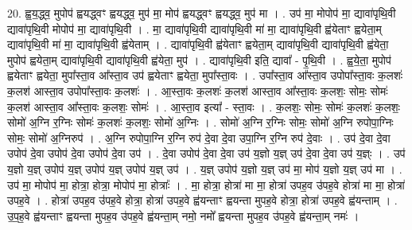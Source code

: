 \documentclass[17pt]{extarticle}
\begin{document}
20. ह्व॒य॒द्ध्व॒ मुपोप॑ ह्वयद्ध्वꣳ ह्वयद्ध्व॒ मुप॑ मा॒ मोप॑ ह्वयद्ध्वꣳ ह्वयद्ध्व॒ मुप॑ मा । . उप॑ मा॒ मोपोप॑ मा॒ द्यावा॑पृथि॒वी द्यावा॑पृथि॒वी मोपोप॑ मा॒ द्यावा॑पृथि॒वी । . मा॒ द्यावा॑पृथि॒वी द्यावा॑पृथि॒वी मा॑ मा॒ द्यावा॑पृथि॒वी ह्व॑येताꣳ ह्वयेता॒म् द्यावा॑पृथि॒वी मा॑ मा॒ द्यावा॑पृथि॒वी ह्व॑येताम् । . द्यावा॑पृथि॒वी ह्व॑येताꣳ ह्वयेता॒म् द्यावा॑पृथि॒वी द्यावा॑पृथि॒वी ह्व॑येता॒ मुपोप॑ ह्वयेता॒म् द्यावा॑पृथि॒वी द्यावा॑पृथि॒वी ह्व॑येता॒ मुप॑ । . द्यावा॑पृथि॒वी इति॒ द्यावा᳚ - पृ॒थि॒वी । . ह्व॒ये॒ता॒ मुपोप॑ ह्वयेताꣳ ह्वयेता॒ मुपा᳚स्ता॒व आ᳚स्ता॒व उप॑ ह्वयेताꣳ ह्वयेता॒ मुपा᳚स्ता॒वः । . उपा᳚स्ता॒व आ᳚स्ता॒व उपोपा᳚स्ता॒वः क॒लशः॑ क॒लश॑ आस्ता॒व उपोपा᳚स्ता॒वः क॒लशः॑ । . आ॒स्ता॒वः क॒लशः॑ क॒लश॑ आस्ता॒व आ᳚स्ता॒वः क॒लशः॒ सोमः॒ सोमः॑ क॒लश॑ आस्ता॒व आ᳚स्ता॒वः क॒लशः॒ सोमः॑ । . आ॒स्ता॒व इत्या᳚ - स्ता॒वः । . क॒लशः॒ सोमः॒ सोमः॑ क॒लशः॑ क॒लशः॒ सोमो॑ अ॒ग्नि र॒ग्निः सोमः॑ क॒लशः॑ क॒लशः॒ सोमो॑ अ॒ग्निः । . सोमो॑ अ॒ग्नि र॒ग्निः सोमः॒ सोमो॑ अ॒ग्नि रुपोपा॒ग्निः सोमः॒ सोमो॑ अ॒ग्निरुप॑ । . अ॒ग्नि रुपोपा॒ग्नि र॒ग्नि रुप॑ दे॒वा दे॒वा उपा॒ग्नि र॒ग्नि रुप॑ दे॒वाः । . उप॑ दे॒वा दे॒वा उपोप॑ दे॒वा उपोप॑ दे॒वा उपोप॑ दे॒वा उप॑ । . दे॒वा उपोप॑ दे॒वा दे॒वा उप॑ य॒ज्ञो य॒ज्ञ् उप॑ दे॒वा दे॒वा उप॑ य॒ज्ञ्ः । . उप॑ य॒ज्ञो य॒ज्ञ् उपोप॑ य॒ज्ञ् उपोप॑ य॒ज्ञ् उपोप॑ य॒ज्ञ् उप॑ । . य॒ज्ञ् उपोप॑ य॒ज्ञो य॒ज्ञ् उप॑ मा॒ मोप॑ य॒ज्ञो य॒ज्ञ् उप॑ मा । . उप॑ मा॒ मोपोप॑ मा॒ होत्रा॒ होत्रा॒ मोपोप॑ मा॒ होत्राः᳚ । . मा॒ होत्रा॒ होत्रा॑ मा मा॒ होत्रा॑ उपह॒व उ॑पह॒वे होत्रा॑ मा मा॒ होत्रा॑ उपह॒वे । . होत्रा॑ उपह॒व उ॑पह॒वे होत्रा॒ होत्रा॑ उपह॒वे ह्व॑यन्ताꣳ ह्वयन्ता मुपह॒वे होत्रा॒ होत्रा॑ उपह॒वे ह्व॑यन्ताम् । . उ॒प॒ह॒वे ह्व॑यन्ताꣳ ह्वयन्ता मुपह॒व उ॑पह॒वे ह्व॑यन्ता॒म् नमो॒ नमो᳚ ह्वयन्ता मुपह॒व उ॑पह॒वे ह्व॑यन्ता॒म् नमः॑ । \newline
\end{document}
